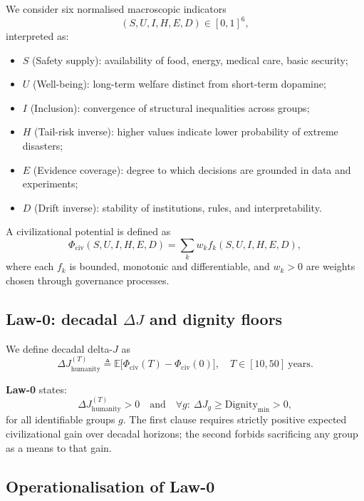 \documentclass[11pt]{article}
\begin{document}
We consider six normalised macroscopic indicators
\[
(S,U,I,H,E,D)\in[0,1]^6,
\]
interpreted as:
\begin{itemize}[leftmargin=1.8em]
  \item $S$ (Safety supply): availability of food, energy, medical care, basic security;
  \item $U$ (Well-being): long-term welfare distinct from short-term dopamine;
  \item $I$ (Inclusion): convergence of structural inequalities across groups;
  \item $H$ (Tail-risk inverse): higher values indicate lower probability of extreme disasters;
  \item $E$ (Evidence coverage): degree to which decisions are grounded in data and experiments;
  \item $D$ (Drift inverse): stability of institutions, rules, and interpretability.
\end{itemize}

A civilizational potential is defined as
\begin{equation}
\Phi_{\mathrm{civ}}(S,U,I,H,E,D)
= \sum_{k} w_k f_k(S,U,I,H,E,D),
\end{equation}
where each $f_k$ is bounded, monotonic and differentiable, and $w_k>0$ are weights chosen through governance processes.

\subsection{Law-0: decadal $\Delta J$ and dignity floors}

We define decadal delta-$J$ as
\begin{equation}
\Delta J_{\mathrm{humanity}}^{(T)}
\triangleq \mathbb{E}\big[\Phi_{\mathrm{civ}}(T) - \Phi_{\mathrm{civ}}(0)\big],
\quad T\in[10,50]\ \mathrm{years}.
\end{equation}

\textbf{Law-0} states:
\begin{equation}
\Delta J_{\mathrm{humanity}}^{(T)} > 0 
\quad\text{and}\quad
\forall g:\ \Delta J_g \ge \mathrm{Dignity}_{\min} > 0,
\label{eq:law0}
\end{equation}
for all identifiable groups $g$. The first clause requires strictly positive expected civilizational gain over decadal horizons; the second forbids sacrificing any group as a means to that gain.

\subsection{Operationalisation of Law-0}
\end{document}
